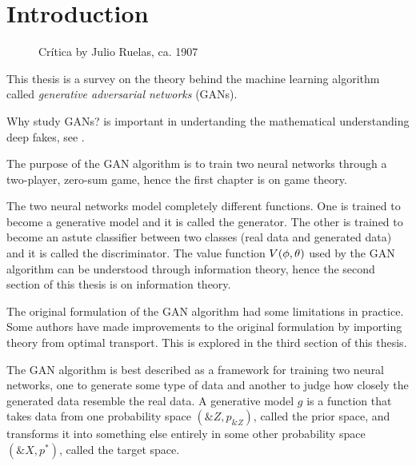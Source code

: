 \section{Introduction}%
\setcounter{page}{1}

\vspace{1cm}

\begin{figure}[h]
  \label{fig:paradise}
  \centering
  \caption{Crítica by Julio Ruelas, ca. 1907}
\end{figure}

\vspace{1cm}

\noindent This thesis is a survey on the theory behind the machine learning
algorithm called \textit{generative adversarial networks} (GANs).

Why study GANs? is important in undertanding the mathematical understanding deep
fakes, see {}.

%

The purpose of the GAN algorithm is to train two neural networks through a
two-player, zero-sum game, hence the first chapter is on game theory.

The two neural networks model completely different functions.  One is
trained to become a generative model and it is called the generator.
The other is trained to become an astute classifier between two
classes (real data and generated data) and it is called the
discriminator.  The value function $V(\phi, \theta)$ used by the GAN algorithm can
be understood through information theory, hence the second section of
this thesis is on information theory.

The original formulation of the GAN algorithm had some limitations in
practice.  Some authors have made improvements to the original
formulation by importing theory from optimal transport.  This is
explored in the third section of this thesis.

The GAN algorithm is best described as a framework for training two
neural networks, one to generate some type of data and another to
judge how closely the generated data resemble the real data.  A
generative model $g$ is a function that takes data from one
probability space $(\&Z, p_{\&Z})$, called the prior space, and
transforms it into something else entirely in some other probability
space $(\&X, p^*)$, called the target space.

